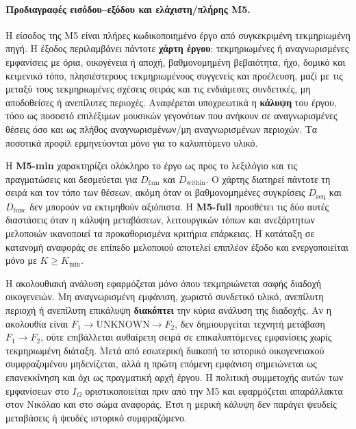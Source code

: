 \documentclass[11pt,a4paper]{article}
\begin{document}
\paragraph{Προδιαγραφές εισόδου--εξόδου και ελάχιστη/πλήρης M5.}
Η είσοδος της M5 είναι πλήρες κωδικοποιημένο έργο από συγκεκριμένη τεκμηριωμένη πηγή. Η έξοδος περιλαμβάνει πάντοτε \textbf{χάρτη έργου}: τεκμηριωμένες ή αναγνωρισμένες εμφανίσεις με όρια, οικογένεια ή αποχή, βαθμονομημένη βεβαιότητα, ήχο, δομικό και κειμενικό τόπο, πλησιέστερους τεκμηριωμένους συγγενείς και προέλευση, μαζί με τις μεταξύ τους τεκμηριωμένες σχέσεις σειράς και τις ενδιάμεσες συνδετικές, μη αποδοθείσες ή ανεπίλυτες περιοχές. Αναφέρεται υποχρεωτικά η \textbf{κάλυψη} του έργου, τόσο ως ποσοστό επιλέξιμων μουσικών γεγονότων που ανήκουν σε αναγνωρισμένες θέσεις όσο και ως πλήθος αναγνωρισμένων/μη αναγνωρισμένων περιοχών. Τα ποσοτικά προφίλ ερμηνεύονται μόνο για το καλυπτόμενο υλικό.

Η \textbf{M5-min} χαρακτηρίζει ολόκληρο το έργο ως προς το λεξιλόγιο και τις πραγματώσεις και δεσμεύεται για $D_{\mathrm{fam}}$ και $D_{\mathrm{within}}$. Ο χάρτης διατηρεί πάντοτε τη σειρά και τον τόπο των θέσεων, ακόμη όταν οι βαθμονομημένες συγκρίσεις $D_{\mathrm{seq}}$ και $D_{\mathrm{func}}$ δεν μπορούν να εκτιμηθούν αξιόπιστα. Η \textbf{M5-full} προσθέτει τις δύο αυτές διαστάσεις όταν η κάλυψη μεταβάσεων, λειτουργικών τόπων και ανεξάρτητων μελοποιών ικανοποιεί τα προκαθορισμένα κριτήρια επάρκειας. Η κατάταξη σε κατανομή αναφοράς σε επίπεδο μελοποιού αποτελεί επιπλέον έξοδο και ενεργοποιείται μόνο με $K\ge K_{\min}$.

Η ακολουθιακή ανάλυση εφαρμόζεται μόνο όπου τεκμηριώνεται σαφής διαδοχή οικογενειών. Μη αναγνωρισμένη εμφάνιση, χωριστό συνδετικό υλικό, ανεπίλυτη περιοχή ή ανεπίλυτη επικάλυψη \textbf{διακόπτει} την κύρια ανάλυση της διαδοχής. Αν η ακολουθία είναι $F_1\rightarrow\mathrm{UNKNOWN}\rightarrow F_2$, δεν δημιουργείται τεχνητή μετάβαση $F_1\rightarrow F_2$, ούτε επιβάλλεται αυθαίρετη σειρά σε επικαλυπτόμενες εμφανίσεις χωρίς τεκμηριωμένη διάταξη. Μετά από εσωτερική διακοπή το ιστορικό οικογενειακού συμφραζομένου μηδενίζεται, αλλά η πρώτη επόμενη εμφάνιση σημειώνεται ως επανεκκίνηση και όχι ως πραγματική αρχή έργου. Η πολιτική συμμετοχής αυτών των εμφανίσεων στο $I_{\Omega}$ οριστικοποιείται πριν από την M5 και εφαρμόζεται απαράλλακτα στον Νικόλαο και στο σώμα αναφοράς. Έτσι η μερική κάλυψη δεν παράγει ψευδείς μεταβάσεις ή ψευδές ιστορικό συμφραζόμενο.
\end{document}
